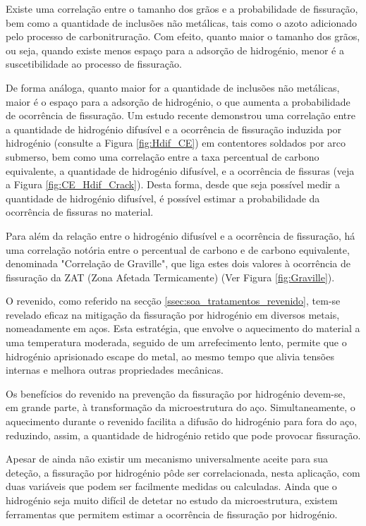 \newpage
\par
Existe uma correlação entre o tamanho dos grãos e a probabilidade de fissuração\cite{Seo2008}, bem como a quantidade de inclusões não metálicas, tais como o azoto adicionado pelo processo de carbonitruração. Com efeito, quanto maior o tamanho dos grãos, ou seja, quando existe menos espaço para a adsorção de hidrogénio, menor é a suscetibilidade ao processo de fissuração.
\par
De forma análoga, quanto maior for a quantidade de inclusões não metálicas, maior é o espaço para a adsorção de hidrogénio, o que aumenta a probabilidade de ocorrência de fissuração. Um estudo recente demonstrou uma correlação entre a quantidade de hidrogénio difusível e a ocorrência de fissuração induzida por hidrogénio\cite{Santos2021} (consulte a Figura \ref{fig:Hdif_CE}) em contentores soldados por arco submerso, bem como uma correlação entre a taxa percentual de carbono equivalente, a quantidade de hidrogénio difusível, e a ocorrência de fissuras (veja a Figura \ref{fig:CE_Hdif_Crack}). Desta forma, desde que seja possível medir a quantidade de hidrogénio difusível, é possível estimar a probabilidade da ocorrência de fissuras no material.
\par
Para além da relação entre o hidrogénio difusível e a ocorrência de fissuração, há uma correlação notória entre o percentual de carbono e de carbono equivalente, denominada "Correlação de Graville", que liga estes dois valores à ocorrência de fissuração da ZAT (Zona Afetada Termicamente) (Ver Figura \ref{fig:Graville})\cite{Olson2007}.
\par
O revenido, como referido na secção \ref{ssec:soa_tratamentos_revenido}, tem-se revelado eficaz na mitigação da fissuração por hidrogénio em diversos metais, nomeadamente em aços. Esta estratégia, que envolve o aquecimento do material a uma temperatura moderada, seguido de um arrefecimento lento, permite que o hidrogénio aprisionado escape do metal, ao mesmo tempo que alivia tensões internas e melhora outras propriedades mecânicas\cite{Krauss2015}.
\par
Os benefícios do revenido na prevenção da fissuração por hidrogénio devem-se, em grande parte, à transformação da microestrutura do aço. Simultaneamente, o aquecimento durante o revenido facilita a difusão do hidrogénio para fora do aço, reduzindo, assim, a quantidade de hidrogénio retido que pode provocar fissuração.
\par
Apesar de ainda não existir um mecanismo universalmente aceite para sua deteção, a fissuração por hidrogénio pôde ser correlacionada, nesta aplicação, com duas variáveis que podem ser facilmente medidas ou calculadas. Ainda que o hidrogénio seja muito difícil de detetar no estudo da microestrutura, existem ferramentas que permitem estimar a ocorrência de fissuração por hidrogénio.

